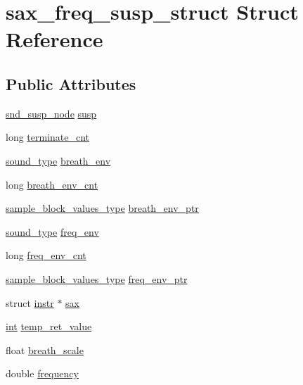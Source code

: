 \hypertarget{structsax__freq__susp__struct}{}\section{sax\+\_\+freq\+\_\+susp\+\_\+struct Struct Reference}
\label{structsax__freq__susp__struct}
\subsection*{Public Attributes}
\begin{DoxyCompactItemize}
\item 
\hyperlink{sound_8h_a6b268203688a934bd798ceb55f85d4c0}{snd\+\_\+susp\+\_\+node} \hyperlink{structsax__freq__susp__struct_aa0a2b5c67a3d19f61c47b641b2f86d00}{susp}
\item 
long \hyperlink{structsax__freq__susp__struct_aab316d2857d0a10d23ffaca3795567fe}{terminate\+\_\+cnt}
\item 
\hyperlink{sound_8h_a792cec4ed9d6d636d342d9365ba265ea}{sound\+\_\+type} \hyperlink{structsax__freq__susp__struct_acbe3c1e550511f37ca0f232793f24891}{breath\+\_\+env}
\item 
long \hyperlink{structsax__freq__susp__struct_afc34619519689e1c2b891757aaefd78f}{breath\+\_\+env\+\_\+cnt}
\item 
\hyperlink{sound_8h_a83d17f7b465d1591f27cd28fc5eb8a03}{sample\+\_\+block\+\_\+values\+\_\+type} \hyperlink{structsax__freq__susp__struct_a8f1ac1b67ade93158f812fe4c5cde6d9}{breath\+\_\+env\+\_\+ptr}
\item 
\hyperlink{sound_8h_a792cec4ed9d6d636d342d9365ba265ea}{sound\+\_\+type} \hyperlink{structsax__freq__susp__struct_a74a15f12e44d2b89f0ad8a21237ab9b9}{freq\+\_\+env}
\item 
long \hyperlink{structsax__freq__susp__struct_ac7765bad3886ff433a9e463a1555c341}{freq\+\_\+env\+\_\+cnt}
\item 
\hyperlink{sound_8h_a83d17f7b465d1591f27cd28fc5eb8a03}{sample\+\_\+block\+\_\+values\+\_\+type} \hyperlink{structsax__freq__susp__struct_a6e219285ba2d67ca01e3990bc8bbc77c}{freq\+\_\+env\+\_\+ptr}
\item 
struct \hyperlink{structinstr}{instr} $\ast$ \hyperlink{structsax__freq__susp__struct_ac7266d4d873e1a165dbd63fb3980a02c}{sax}
\item 
\hyperlink{xmltok_8h_a5a0d4a5641ce434f1d23533f2b2e6653}{int} \hyperlink{structsax__freq__susp__struct_ac5409fab60b473da7946e2e31c4ae572}{temp\+\_\+ret\+\_\+value}
\item 
float \hyperlink{structsax__freq__susp__struct_adeadf2822895a597d32eb117cdcecbc1}{breath\+\_\+scale}
\item 
double \hyperlink{structsax__freq__susp__struct_a4fc431728ddfd5b343d092e42d550a24}{frequency}
\end{DoxyCompactItemize}


